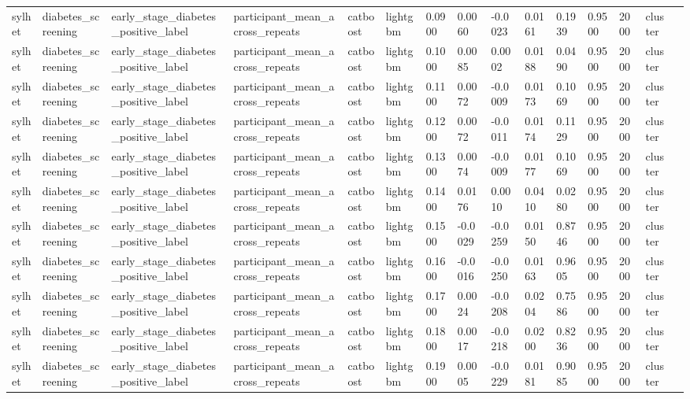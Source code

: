 \begin{tabular}{lllllllllllllll}
sylhet & diabetes\_screening & early\_stage\_diabetes\_positive\_label & participant\_mean\_across\_repeats & catboost & lightgbm & 0.0900 & 0.0060 & -0.0023 & 0.0161 & 0.1939 & 0.9500 & 2000 & cluster &  \\
sylhet & diabetes\_screening & early\_stage\_diabetes\_positive\_label & participant\_mean\_across\_repeats & catboost & lightgbm & 0.1000 & 0.0085 & 0.0002 & 0.0188 & 0.0490 & 0.9500 & 2000 & cluster &  \\
sylhet & diabetes\_screening & early\_stage\_diabetes\_positive\_label & participant\_mean\_across\_repeats & catboost & lightgbm & 0.1100 & 0.0072 & -0.0009 & 0.0173 & 0.1069 & 0.9500 & 2000 & cluster &  \\
sylhet & diabetes\_screening & early\_stage\_diabetes\_positive\_label & participant\_mean\_across\_repeats & catboost & lightgbm & 0.1200 & 0.0072 & -0.0011 & 0.0174 & 0.1129 & 0.9500 & 2000 & cluster &  \\
sylhet & diabetes\_screening & early\_stage\_diabetes\_positive\_label & participant\_mean\_across\_repeats & catboost & lightgbm & 0.1300 & 0.0074 & -0.0009 & 0.0177 & 0.1069 & 0.9500 & 2000 & cluster &  \\
sylhet & diabetes\_screening & early\_stage\_diabetes\_positive\_label & participant\_mean\_across\_repeats & catboost & lightgbm & 0.1400 & 0.0176 & 0.0010 & 0.0410 & 0.0280 & 0.9500 & 2000 & cluster &  \\
sylhet & diabetes\_screening & early\_stage\_diabetes\_positive\_label & participant\_mean\_across\_repeats & catboost & lightgbm & 0.1500 & -0.0029 & -0.0259 & 0.0150 & 0.8746 & 0.9500 & 2000 & cluster &  \\
sylhet & diabetes\_screening & early\_stage\_diabetes\_positive\_label & participant\_mean\_across\_repeats & catboost & lightgbm & 0.1600 & -0.0016 & -0.0250 & 0.0163 & 0.9605 & 0.9500 & 2000 & cluster &  \\
sylhet & diabetes\_screening & early\_stage\_diabetes\_positive\_label & participant\_mean\_across\_repeats & catboost & lightgbm & 0.1700 & 0.0024 & -0.0208 & 0.0204 & 0.7586 & 0.9500 & 2000 & cluster &  \\
sylhet & diabetes\_screening & early\_stage\_diabetes\_positive\_label & participant\_mean\_across\_repeats & catboost & lightgbm & 0.1800 & 0.0017 & -0.0218 & 0.0200 & 0.8236 & 0.9500 & 2000 & cluster &  \\
sylhet & diabetes\_screening & early\_stage\_diabetes\_positive\_label & participant\_mean\_across\_repeats & catboost & lightgbm & 0.1900 & 0.0005 & -0.0229 & 0.0181 & 0.9085 & 0.9500 & 2000 & cluster &  \\

\end{tabular}
